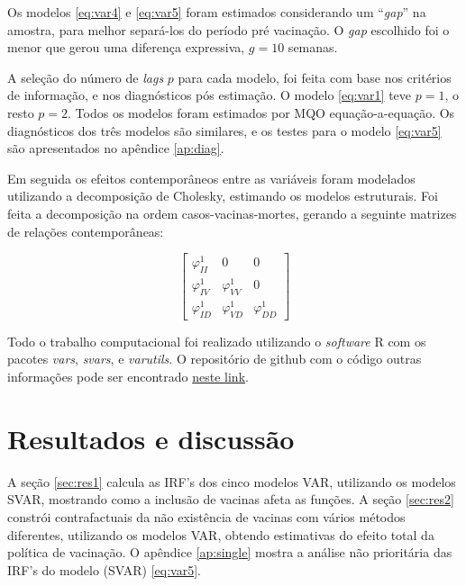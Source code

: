 \documentclass[
    article,
	12pt,				%
	oneside,			%
	a4paper,			%
	english,			%
	brazil,				%
	hyperref = {colorlinks, citecolor=c1d, linkcolor=c2d, urlcolor=c3d, colorlinks}
	]{abntex2}
\begin{document}
Os modelos \eqref{eq:var4} e \eqref{eq:var5} foram estimados considerando um ``\textit{gap}'' na amostra, para melhor separá-los do período pré vacinação. O \textit{gap} escolhido foi o menor que gerou uma diferença expressiva, $g = 10$ semanas.

A seleção do número de \textit{lags} $p$ para cada modelo, foi feita com base nos critérios de informação, e nos diagnósticos pós estimação. O modelo \eqref{eq:var1} teve $p = 1$, o resto $p = 2$. Todos os modelos foram estimados por MQO equação-a-equação. Os diagnósticos dos três modelos são similares, e os testes para o modelo \eqref{eq:var5} são apresentados no apêndice \ref{ap:diag}.

Em seguida os efeitos contemporâneos entre as variáveis foram modelados utilizando a decomposição de Cholesky, estimando os modelos estruturais. Foi feita a decomposição na ordem casos-vacinas-mortes, gerando a seguinte matrizes de relações contemporâneas:

\begin{equation}\label{eq:svar}
    \begin{bmatrix}
    \varphi_{II}^1 & 0 & 0 \\
    \varphi_{IV}^1 & \varphi_{VV}^1 & 0 \\
    \varphi_{ID}^1 & \varphi_{VD}^1 & \varphi_{DD}^1
    \end{bmatrix}
\end{equation}

Todo o trabalho computacional foi realizado utilizando o \textit{software} R com os pacotes \textit{vars}, \textit{svars}, e \textit{varutils}. O repositório de github com o código outras informações pode ser encontrado \href{https://github.com/ricardo-semiao/covid-svardiff}{neste link}.



\let\clearpage\relax
\chapter{Resultados e discussão}

A seção \ref{sec:res1} calcula as IRF's dos cinco modelos VAR, utilizando os modelos SVAR, mostrando como a inclusão de vacinas afeta as funções. A seção \ref{sec:res2} constrói contrafactuais da não existência de vacinas com vários métodos diferentes, utilizando os modelos VAR, obtendo estimativas do efeito total da política de vacinação. O apêndice \ref{ap:single} mostra a análise não prioritária das IRF's do modelo (SVAR) \eqref{eq:var5}.
\end{document}
